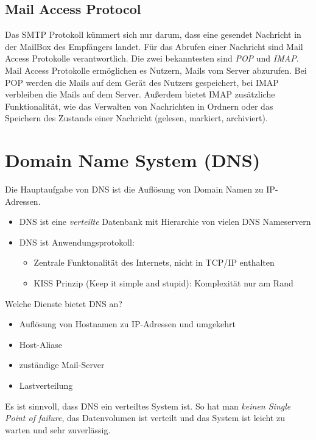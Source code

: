 \subsection{Mail Access Protocol}
Das SMTP Protokoll kümmert sich nur darum, dass eine gesendet Nachricht in der MailBox des Empfängers landet. Für das Abrufen einer Nachricht sind Mail Access Protokolle verantwortlich. Die zwei bekanntesten sind \emph{POP} und \emph{IMAP}.\\
\noindent Mail Access Protokolle ermöglichen es Nutzern, Mails vom Server abzurufen. Bei POP werden die Mails auf dem Gerät des Nutzers gespeichert, bei IMAP verbleiben die Mails auf dem Server. Außerdem bietet IMAP zusätzliche Funktionalität, wie das Verwalten von Nachrichten in Ordnern oder das Speichern des Zustands einer Nachricht (gelesen, markiert, archiviert).

\section{Domain Name System (DNS)}
Die Hauptaufgabe von DNS ist die Auflösung von Domain Namen zu IP-Adressen.
\begin{itemize}
    \item DNS ist eine \emph{verteilte} Datenbank mit Hierarchie von vielen DNS Nameservern
    \item DNS ist Anwendungsprotokoll:
        \begin{itemize}
            \item Zentrale Funktonalität des Internets, nicht in TCP/IP enthalten
            \item KISS Prinzip (Keep it simple and stupid): Komplexität nur am Rand
        \end{itemize}
\end{itemize}

\noindent Welche Dienste bietet DNS an?
\begin{itemize}
    \item Auflösung von Hostnamen zu IP-Adressen und umgekehrt
    \item Host-Aliase
    \item zuständige Mail-Server
    \item Lastverteilung
\end{itemize}

\noindent Es ist sinnvoll, dass DNS ein verteiltes System ist. So hat man \emph{keinen Single Point of failure}, das Datenvolumen ist verteilt und das System ist leicht zu warten und sehr zuverlässig.

